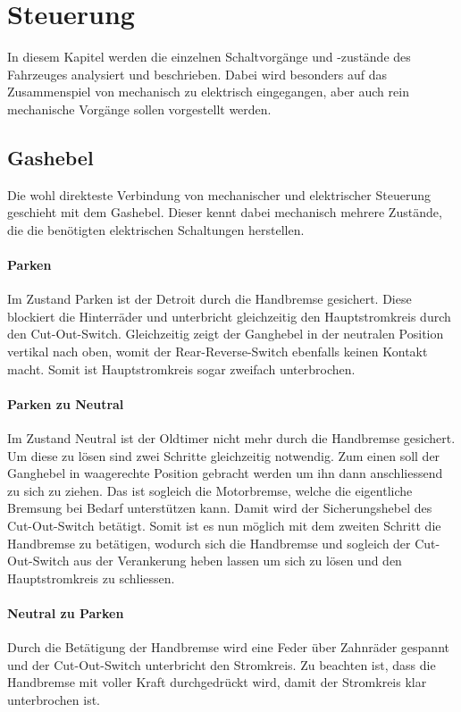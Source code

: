 \section{Steuerung}
In diesem Kapitel werden die einzelnen Schaltvorgänge und -zustände des Fahrzeuges analysiert und beschrieben. Dabei wird besonders auf das Zusammenspiel von mechanisch zu elektrisch eingegangen, aber auch rein mechanische Vorgänge sollen vorgestellt werden.

\subsection{Gashebel}
Die wohl direkteste Verbindung von mechanischer und elektrischer Steuerung geschieht mit dem Gashebel. Dieser kennt dabei mechanisch mehrere Zustände, die die benötigten elektrischen Schaltungen herstellen.

\paragraph{Parken}
Im Zustand Parken ist der Detroit durch die Handbremse gesichert. Diese blockiert die Hinterräder und unterbricht gleichzeitig den Hauptstromkreis durch den Cut-Out-Switch. Gleichzeitig zeigt der Ganghebel in der neutralen Position vertikal nach oben, womit der Rear-Reverse-Switch ebenfalls keinen Kontakt macht. Somit ist Hauptstromkreis sogar zweifach unterbrochen.

\paragraph{Parken zu Neutral}
Im Zustand Neutral ist der Oldtimer nicht mehr durch die Handbremse gesichert. Um diese zu lösen sind zwei Schritte gleichzeitig notwendig. Zum einen soll der Ganghebel in waagerechte Position gebracht werden um ihn dann anschliessend zu sich zu ziehen. Das ist sogleich die Motorbremse, welche die eigentliche Bremsung bei Bedarf unterstützen kann. Damit wird der Sicherungshebel des Cut-Out-Switch betätigt. Somit ist es nun möglich mit dem zweiten Schritt die Handbremse zu betätigen, wodurch sich die Handbremse und sogleich der Cut-Out-Switch aus der Verankerung heben lassen um sich zu lösen und den Hauptstromkreis zu schliessen.

\paragraph{Neutral zu Parken}
Durch die Betätigung der Handbremse wird eine Feder über Zahnräder gespannt und der Cut-Out-Switch unterbricht den Stromkreis. Zu beachten ist, dass die Handbremse mit voller Kraft durchgedrückt wird, damit der Stromkreis klar unterbrochen ist.


